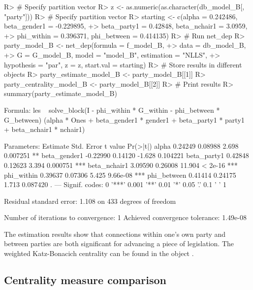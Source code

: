 \documentclass[nojss]{jss}
\begin{document}
\begin{CodeChunk}
\begin{CodeInput}
R> # Specify partition vector
R> z <- as.numeric(as.character(db_model_B[, "party"]))
R> # Specify partition vector
R> starting <- c(alpha = 0.242486, beta_gender1 = -0.229895,
+> beta_party1 = 0.42848, beta_nchair1 = 3.0959,
+> phi_within = 0.396371, phi_between = 0.414135)
R> # Run net_dep
R> party_model_B <- net_dep(formula = f_model_B,
+> data = db_model_B,
+> G = G_model_B, model = "model_B", estimation = "NLLS",
+> hypothesis = "par", z = z, start.val = starting)
R> # Store results in different objects
R> party_estimate_model_B <- party_model_B[[1]]
R> party_centrality_model_B <- party_model_B[[2]]
R> # Print results
R> summary(party_estimate_model_B)
\end{CodeInput}
\begin{CodeOutput}
Formula: les ~ solve_block(I - phi_within * G_within - phi_between * G_between) %
(alpha * Ones + beta_gender1 * gender1 + beta_party1 * party1 + beta_nchair1 * nchair1)

Parameters:
Estimate Std. Error t value Pr(>|t|)    
alpha         0.24249    0.08988   2.698 0.007251 ** 
beta_gender1 -0.22990    0.14120  -1.628 0.104221    
beta_party1   0.42848    0.12623   3.394 0.000751 ***
beta_nchair1  3.09590    0.26008  11.904  < 2e-16 ***
phi_within    0.39637    0.07306   5.425 9.66e-08 ***
phi_between   0.41414    0.24175   1.713 0.087420 .  
---
Signif. codes:  0 '***' 0.001 '**' 0.01 '*' 0.05 '.' 0.1 ' ' 1

Residual standard error: 1.108 on 433 degrees of freedom

Number of iterations to convergence: 1 
Achieved convergence tolerance: 1.49e-08
\end{CodeOutput}
\end{CodeChunk}


The estimation results show that connections within one's own party and between parties are both significant for advancing a piece of legislation. The weighted Katz-Bonacich centrality can be found in the object .

\subsection{Centrality measure comparison}
\end{document}
